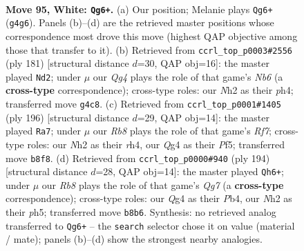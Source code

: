 \documentclass[11pt]{article}
\begin{document}
\clearpage

\begin{figure}[p]\centering
\begin{subfigure}{0.46\textwidth}\centering
\resizebox{\linewidth}{!}{%
\newchessgame
\chessboard[
  setfen={1R3b2/r6k/8/7K/6Q1/8/7N/8 w - - 0 95},
  showmover=false,
  pgfstyle=straightmove, color=movearrow, markmove={g4-g6}
]}
\caption{}
\end{subfigure}\hfill
\begin{subfigure}{0.46\textwidth}\centering
\resizebox{\linewidth}{!}{%
\newchessgame
\chessboard[
  setfen={8/8/8/5B2/3k2KP/1n6/5r2/4R3 b - - 0 91},
  showmover=false,
  pgfstyle=straightmove, color=movearrow, markmove={b3-d2}
]}
\caption{}
\end{subfigure}
\\[4pt]
\begin{subfigure}{0.46\textwidth}\centering
\resizebox{\linewidth}{!}{%
\newchessgame
\chessboard[
  setfen={8/5R2/5p1k/5P2/7r/5K2/8/8 w - - 10 99},
  showmover=false,
  pgfstyle=straightmove, color=movearrow, markmove={f7-a7}
]}
\caption{}
\end{subfigure}\hfill
\begin{subfigure}{0.46\textwidth}\centering
\resizebox{\linewidth}{!}{%
\newchessgame
\chessboard[
  setfen={8/b5Q1/3k4/7p/1P2K3/r7/8/8 w - - 1 98},
  showmover=false,
  pgfstyle=straightmove, color=movearrow, markmove={g7-h6}
]}
\caption{}
\end{subfigure}
\caption{\textbf{Move 95, White: \texttt{Qg6+}.} (a) Our position; Melanie plays \texttt{Qg6+} (\texttt{g4g6}). Panels (b)--(d) are the retrieved master positions whose correspondence most drove this move (highest QAP objective among those that transfer to it). (b) Retrieved from \texttt{ccrl\_top\_p0003\#2556} (ply 181) [structural distance $d$=30, QAP obj=16]: the master played \texttt{Nd2}; under $\mu$ our \emph{Qg4} plays the role of that game's \emph{Nb6} (a \textbf{cross-type} correspondence); cross-type roles: our \emph{N}h2 as their \emph{p}h4; transferred move \texttt{g4c8}. (c) Retrieved from \texttt{ccrl\_top\_p0001\#1405} (ply 196) [structural distance $d$=29, QAP obj=14]: the master played \texttt{Ra7}; under $\mu$ our \emph{Rb8} plays the role of that game's \emph{Rf7}; cross-type roles: our \emph{N}h2 as their \emph{r}h4, our \emph{Q}g4 as their \emph{P}f5; transferred move \texttt{b8f8}. (d) Retrieved from \texttt{ccrl\_top\_p0000\#940} (ply 194) [structural distance $d$=28, QAP obj=14]: the master played \texttt{Qh6+}; under $\mu$ our \emph{Rb8} plays the role of that game's \emph{Qg7} (a \textbf{cross-type} correspondence); cross-type roles: our \emph{Q}g4 as their \emph{P}b4, our \emph{N}h2 as their \emph{p}h5; transferred move \texttt{b8b6}. Synthesis: no retrieved analog transferred to \texttt{Qg6+} -- the \texttt{search} selector chose it on value (material / mate); panels (b)--(d) show the strongest nearby analogies.}
\label{fig:thought-m188}
\end{figure}
\end{document}
